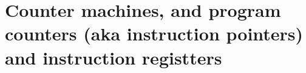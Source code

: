 
\chapter{Counter machines, and program counters (aka instruction pointers) and instruction registters}
